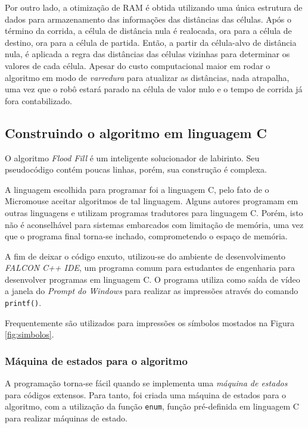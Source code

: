 Por outro lado, a otimização de RAM é obtida utilizando uma única estrutura de dados para armazenamento das informações das distâncias das células. Após o término da corrida, a célula de distância nula é realocada, ora para a célula de destino, ora para a célula de partida. Então, a partir da célula-alvo de distância nula, é aplicada a regra das distâncias das células vizinhas para determinar os valores de cada célula. Apesar do custo computacional maior em rodar o algoritmo em modo de \emph{varredura} para atualizar as distâncias, nada atrapalha, uma vez que o robô estará parado na célula de valor nulo e o tempo de corrida já fora contabilizado.
	
\subsection{Construindo o algoritmo em linguagem C}
O algoritmo \emph{Flood Fill} é um inteligente solucionador de labirinto. Seu pseudocódigo contém poucas linhas, porém, sua construção é complexa. 

A linguagem escolhida para programar foi a linguagem C, pelo fato de o Micromouse aceitar algoritmos de tal linguagem. Alguns autores programam em outras linguagens e utilizam programas tradutores para linguagem C. Porém, isto não é aconselhável para sistemas embarcados com limitação de memória, uma vez que o programa final torna-se inchado, comprometendo o espaço de memória.

A fim de deixar o código enxuto, utilizou-se do ambiente de desenvolvimento \textit{FALCON C++ IDE}, um programa comum para estudantes de engenharia para desenvolver programas em linguagem C. O programa utiliza como saída de vídeo a janela do \emph{Prompt do Windows} para realizar as impressões através do comando \verb+printf()+.

Frequentemente são utilizados para impressões os símbolos mostados na Figura \ref{fig:simbolos}.


\subsubsection{Máquina de estados para o algoritmo}
A programação torna-se fácil quando se implementa uma \emph{máquina de estados} para códigos extensos. Para tanto, foi criada uma máquina de estados para o algoritmo, com a utilização da função \verb+enum+, função pré-definida em linguagem C para realizar máquinas de estado. 

